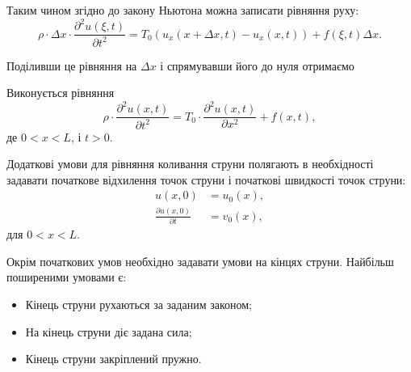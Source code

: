 Таким чином згідно до закону Ньютона можна записати рівняння руху:
\begin{equation}
	\rho \cdot \Delta x \cdot \frac{\partial^2 u(\xi, t)}{\partial t^2} = T_0(u_x(x + \Delta x, t) - u_x(x, t)) + f(\xi, t) \Delta x.
\end{equation}

Поділивши це рівняння на $\Delta x$ і спрямувавши його до нуля отримаємо 

\begin{th_equation}
	Виконується рівняння
	\begin{equation}
		\rho \cdot \frac{\partial^2 u(x, t)}{\partial t^2} = T_0 \cdot \frac{\partial^2 u(x, t)}{\partial x^2} + f(x, t),
	\end{equation}
	де $0 < x < L$, і $t > 0$.
\end{th_equation}

Додаткові умови для рівняння коливання струни полягають в необхідності задавати початкове відхилення точок струни і початкові швидкості точок струни:
\begin{align}
	u(x, 0) &= u_0(x), \\
	\frac{\partial u(x, 0)}{\partial t} &= v_0(x),
\end{align}
для $0 < x < L$. \medskip

Окрім початкових умов необхідно задавати умови на кінцях струни. Найбільш поширеними умовами є:
\begin{itemize}
	\item Кінець струни рухаються за заданим законом;
	\item На кінець струни діє задана сила;
	\item Кінець струни закріплений пружно.
\end{itemize}

